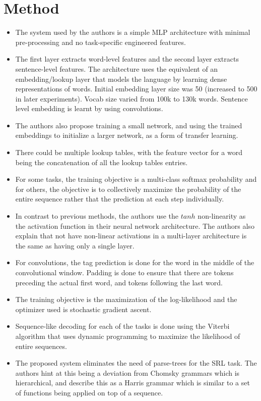 \documentclass[12pt]{scrartcl}
\begin{document}
\section{Method}
  \begin{itemize}
    \item The system used by the authors is a simple MLP architecture with minimal pre-processing and no task-specific engineered features.
    \item The first layer extracts word-level features and the second layer extracts sentence-level features. The architecture uses the equivalent of an embedding/lookup layer that models the language by learning dense representations of words. Initial embedding layer size was 50 (increased to 500 in later experiments). Vocab size varied from 100k to 130k words. Sentence level embedding is learnt by using convolutions.
    \item The authors also propose training a small network, and using the trained embeddings to initialize a larger network, as a form of transfer learning.
    \item There could be multiple lookup tables, with the feature vector for a word being the concatenation of all the lookup tables entries.
    \item For some tasks, the training objective is a multi-class softmax probability and for others, the objective is to collectively maximize the probability of the entire sequence rather that the prediction at each step individually.
    \item In contrast to previous methods, the authors use the $tanh$ non-linearity as the activation function in their neural network architecture. The authors also explain that not have non-linear activations in a multi-layer architecture is the same as having only a single layer.
    \item For convolutions, the tag prediction is done for the word in the middle of the convolutional window. Padding is done to ensure that there are tokens preceding the actual first word, and tokens following the last word.
    \item The training objective is the maximization of the log-likelihood and the optimizer used is stochastic gradient ascent.
    \item Sequence-like decoding for each of the tasks is done using the Viterbi algorithm that uses dynamic programming to maximize the likelihood of entire sequences.
    \item The proposed system eliminates the need of parse-trees for the SRL task. The authors hint at this being a deviation from Chomsky grammars which is hierarchical, and describe this as a Harris grammar which is similar to a set of functions being applied on top of a sequence.

\end{itemize}
\end{document}

